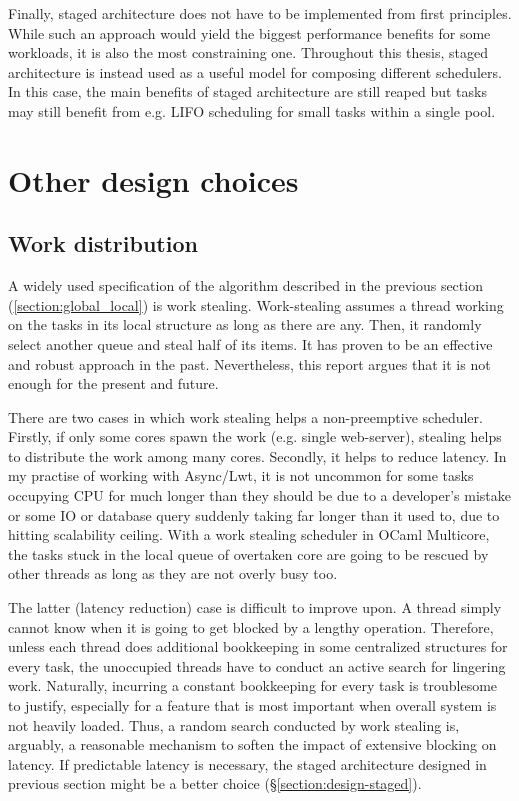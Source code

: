 \documentclass[12pt,a4paper,twoside]{report}
\begin{document}
\label{section:staged-as-composition}
Finally, staged architecture does not have to be implemented from first principles. While such an approach would yield the biggest performance benefits for some workloads, it is also the most constraining one. Throughout this thesis, staged architecture is instead used as a useful model for composing different schedulers. In this case, the main benefits of staged architecture are still reaped but tasks may still benefit from e.g. LIFO scheduling for small tasks within a single pool. 



\section{Other design choices}


\subsection{Work distribution}
\label{section:work-distribution}
A widely used specification of the algorithm described in the previous section (\ref{section:global_local}) is work stealing. Work-stealing assumes a thread working on the tasks in its local structure as long as there are any. Then, it randomly select another queue and steal half of its items. It has proven to be an effective and robust approach in the past. Nevertheless, this report argues that it is not enough for the present and future. 

There are two cases in which work stealing helps a non-preemptive scheduler. Firstly, if only some cores spawn the work (e.g. single web-server), stealing helps to distribute the work among many cores. Secondly, it helps to reduce latency. In my practise of working with Async/Lwt, it is not uncommon for some tasks occupying CPU for much longer than they should be due to a developer's mistake or some IO or database query suddenly taking far longer than it used to, due to hitting scalability ceiling. With a work stealing scheduler in OCaml Multicore, the tasks stuck in the local queue of overtaken core are going to be rescued by other threads as long as they are not overly busy too. 

The latter (latency reduction) case is difficult to improve upon. A thread simply cannot know when it is going to get blocked by a lengthy operation. Therefore, unless each thread does additional bookkeeping in some centralized structures for every task, the unoccupied threads have to conduct an active search for lingering work. Naturally, incurring a constant bookkeeping for every task is troublesome to justify, especially for a feature that is most important when overall system is not heavily loaded. Thus, a random search conducted by work stealing is, arguably, a reasonable mechanism to soften the impact of extensive blocking on latency. If predictable latency is necessary, the staged architecture designed in previous section might be a better choice (\S\ref{section:design-staged}).
\end{document}
